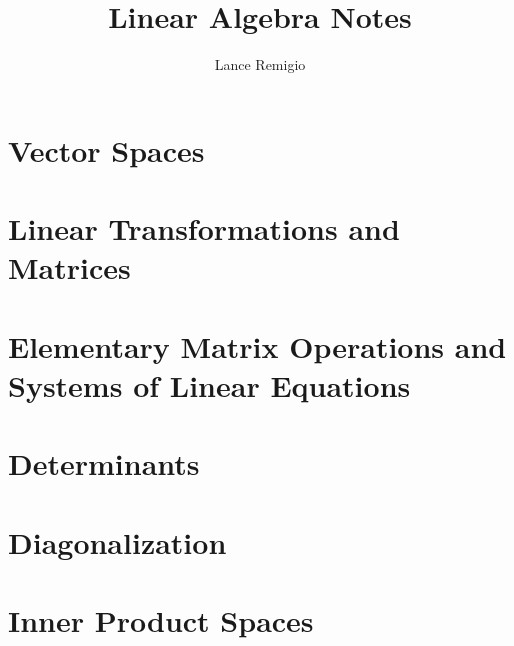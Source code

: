 \documentclass[11pt,a4paper]{book}
\title{Linear Algebra Notes}
\author{Lance Remigio}
\begin{document}
\maketitle
\tableofcontents
\listoftheorems[ignoreall,show={theorem,defn}]
\chapter{Vector Spaces}











\chapter{Linear Transformations and Matrices}











\chapter{Elementary Matrix Operations and Systems of Linear Equations}





\chapter{Determinants}







\chapter{Diagonalization}





\chapter{Inner Product Spaces}












\end{document}
